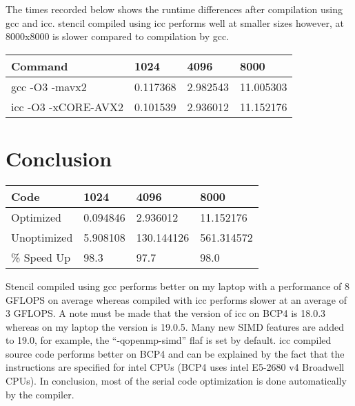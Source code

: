 \documentclass{article}
\begin{document}
The times recorded below shows the runtime differences after compilation
using gcc and icc. stencil compiled using icc performs well at smaller
sizes however, at 8000x8000 is slower compared to compilation by gcc.

\begin{table}[H]
\centering
\begin{tabular}{@{}llll@{}}
\toprule
Command                         & 1024     & 4096     & 8000      \\ \midrule
gcc -O3 -mavx2                  & 0.117368 & 2.982543 & 11.005303 \\
icc -O3 -xCORE-AVX2             & 0.101539 & 2.936012 & 11.152176 \\ \bottomrule
\end{tabular}
\end{table}

\section{Conclusion}

\begin{table}[H]
\centering
\begin{tabular}{@{}llll@{}}
\toprule
Code                            & 1024     & 4096       & 8000      \\ \midrule
Optimized                       & 0.094846 & 2.936012   & 11.152176 \\
Unoptimized                     & 5.908108 & 130.144126 & 561.314572\\
\% Speed Up                     & 98.3     & 97.7       & 98.0      \\ \bottomrule
\end{tabular}
\end{table}

Stencil compiled using gcc performs better on my laptop with a
performance of 8 GFLOPS on average whereas compiled with icc performs
slower at an average of 3 GFLOPS. A note must be made that the version
of icc on BCP4 is 18.0.3 whereas on my laptop the version is 19.0.5.
Many new SIMD features are added to 19.0, for example, the
``-qopenmp-simd'' flaf is set by default. icc compiled source code
performs better on BCP4 and can be explained by the fact that the
instructions are specified for intel CPUs (BCP4 uses intel E5-2680 v4
Broadwell CPUs). In conclusion, most of the serial code optimization is
done automatically by the compiler.
\end{document}
